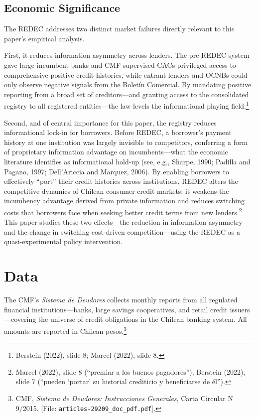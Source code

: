 \documentclass[12pt]{article}
\theoremstyle{plain}
\theoremstyle{plain}
\begin{document}
\subsection{Economic Significance}

The REDEC addresses two distinct market failures directly relevant to this paper's empirical analysis.

First, it reduces information asymmetry across lenders. The pre-REDEC system gave large incumbent banks and CMF-supervised CACs privileged access to comprehensive positive credit histories, while entrant lenders and OCNBs could only observe negative signals from the Bolet\'in Comercial. By mandating positive reporting from a broad set of creditors—and granting access to the consolidated registry to all registered entities—the law levels the informational playing field.\footnote{Berstein (2022), slide 8; Marcel (2022), slide 8.}

Second, and of central importance for this paper, the registry reduces informational lock-in for borrowers. Before REDEC, a borrower's payment history at one institution was largely invisible to competitors, conferring a form of proprietary information advantage on incumbents—what the economic literature identifies as informational hold-up (see, e.g., Sharpe, 1990; Padilla and Pagano, 1997; Dell'Ariccia and Marquez, 2006). By enabling borrowers to effectively ``port'' their credit histories across institutions, REDEC alters the competitive dynamics of Chilean consumer credit markets: it weakens the incumbency advantage derived from private information and reduces switching costs that borrowers face when seeking better credit terms from new lenders.\footnote{Marcel (2022), slide 8 (``premiar a los buenos pagadores''); Berstein (2022), slide 7 (``pueden `portar' su historial crediticio y beneficiarse de \'el'').} This paper studies these two effects—the reduction in information asymmetry and the change in switching cost-driven competition—using the REDEC as a quasi-experimental policy intervention.

\section{Data}

 The CMF's \textit{Sistema de Deudores} collects monthly reports from all regulated financial institutions—banks, large savings cooperatives, and retail credit issuers—covering the universe of credit obligations in the Chilean banking system. All amounts are reported in Chilean pesos.\footnote{CMF, \textit{Sistema de Deudores: Instrucciones Generales}, Carta Circular N\textdegree{} 9/2015. [File: \texttt{articles-29209\_doc\_pdf.pdf}].}
\end{document}
